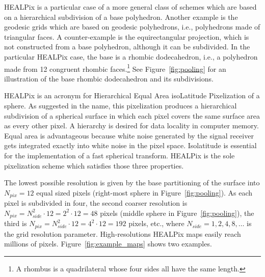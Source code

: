 \documentclass[final,twocolumn,3p,times,authoryear]{elsarticle}
\newcommand{\figref}[1]{Figure~\ref{fig:#1}}
\newcommand{\1}{\b{1}}              %
\newcommand{\0}{\b{0}}              %
\begin{document}
HEALPix is a particular case of a more general class of schemes which are based on a hierarchical subdivision of a base polyhedron.
Another example is the geodesic grids which are based on geodesic polyhedrons, i.e., polyhedrons made of triangular faces. A counter-example is the equirectangular projection, which is not constructed from a base polyhedron, although it can be subdivided.
In the particular HEALPix case, the base is a rhombic dodecahedron, i.e., a polyhedron made from 12 congruent rhombic faces.\footnote{A rhombus is a quadrilateral whose four sides all have the same length.} See \figref{pooling} for an illustration of the base rhombic dodecahedron and its subdivisions.

HEALPix is an acronym for Hierarchical Equal Area isoLatitude Pixelization of a sphere. As suggested in the name, this pixelization produces a hierarchical subdivision of a spherical surface in which each pixel covers the same surface area as every other pixel.
A hierarchy is desired for data locality in computer memory. Equal area is advantageous because white noise generated by the signal receiver gets integrated exactly into white noise in the pixel space. Isolatitude is essential for the implementation of a fast spherical transform. HEALPix is the sole pixelization scheme which satisfies those three properties.

The lowest possible resolution is given by the base partitioning of the surface into $N_{pix} = 12$ equal sized pixels (right-most sphere in \figref{pooling}). As each pixel is subdivided in four, the second coarser resolution is $N_{pix} = N_{side}^2 \cdot 12 = 2^2 \cdot 12 = 48$ pixels (middle sphere in \figref{pooling}), the third is $N_{pix} = N_{side}^2 \cdot 12 = 4^2 \cdot 12 = 192$ pixels, etc., where $N_{side} = 1, 2, 4, 8, \ldots$ is the grid resolution parameter.
High-resolutions HEALPix maps easily reach millions of pixels. \figref{example_maps} shows two examples.
\end{document}
